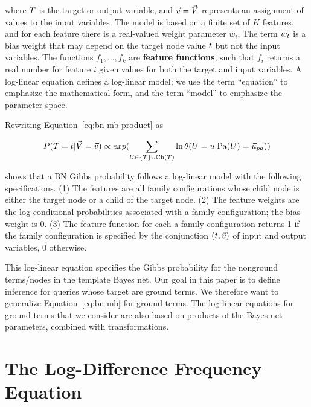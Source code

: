 \documentclass[twoside,11pt]{article}
\begin{document}
\noindent where $T$ is the target or output variable, and $\vec{v} = \vec{V}$ represents an assignment of values to the input variables. The model is based on a finite set of $K$ features, and for each feature there is a real-valued weight parameter $w_{i}$. The term $w_{t}$ is a bias weight that may depend on the target node value $t$ but not the input variables. The functions $f_{1},\ldots,f_{k}$ are \textbf{feature functions}, such that $f_{i}$ returns a real number for feature $i$ given values for both the target and input variables. A log-linear equation defines a log-linear model; we use the term ``equation'' to emphasize the mathematical form, and the term ``model'' to emphasize the parameter space.

Rewriting Equation~\ref{eq:bn-mb-product} as 

\begin{equation} \label{eq:bn-mb}
\Gprob{\TT = \TV} {\VF = \VTuple} \propto exp(\sum_{\UT \in \{\TT\} \cup \Ch{\TT}} \ln\cprob{\UT = \UV}{\Pa{\UT} = \Prange{\UT}})
\end{equation}

\noindent shows that a BN Gibbs probability follows a log-linear model with the following specifications. (1) The features are all family configurations whose child node is either the target node or a child of the target node. (2) The feature weights are the log-conditional probabilities associated with a family configuration; the bias weight is 0. (3) The feature function for each a family configuration returns 1 if the family configuration is specified by the conjunction $(t,\vec{v})$ of input and output variables, 0 otherwise. 

This log-linear equation specifies the Gibbs probability for the nonground terms/nodes in the template Bayes net. Our goal in this paper is to define inference for queries whose target are ground terms. We therefore want to generalize Equation~\eqref{eq:bn-mb} for ground terms. The log-linear equations for ground terms that we consider are also based on products of the Bayes net parameters, combined with transformations. 



\section{The Log-Difference Frequency Equation} 
\label{sec:theequation}
\end{document}
